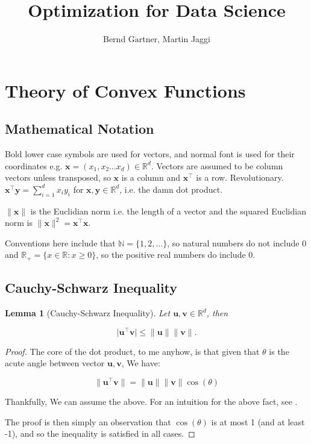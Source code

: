 \documentclass{article}
\newtheorem{lemma}[theorem]{Lemma}
\begin{document}
\title{Optimization for Data Science}
\author{Bernd G$\ddot{\text{a}}$rtner, Martin Jaggi}
\date{}

\maketitle

\section{Theory of Convex Functions}

	\subsection{Mathematical Notation}
	
		Bold lower case symbols are used for vectors, and normal font is used for their coordinates e.g. $\mathbf{x} = (x_1, x_2\ldots x_d)\in \mathbb{R}^d$. Vectors are assumed to be column vectors unless transposed, so $\mathbf{x}$ is a column and $\mathbf{x}^\top$ is a row. Revolutionary. $\mathbf{x^\top y} = \sum^d_{i=1} x_i y_i$ for $\mathbf{x, y}\in\mathbb{R}^d$, i.e. the damn dot product.
		
		$\|\mathbf{x}\|$ is the Euclidian norm i.e. the length of a vector and the squared Euclidian norm is $\|\mathbf{x}\|^2 = \mathbf{x^\top x}$.
		
		Conventions here include that $\mathbb{N} = \{1, 2,\ldots \}$, so natural numbers do not include 0 and $\mathbb{R}_+ = \{x\in\mathbb{R}: x\ge 0 \}$, so the positive real numbers do include 0.
		
	\subsection{Cauchy-Schwarz Inequality}

		\begin{lemma}[Cauchy-Schwarz Inequality]
			Let $\mathbf{u, v}\in\mathbb{R}^d$, then
			
			\[ |\mathbf{u^\top v| \le \|u\|\|v\|}. \]
		\end{lemma}

		\begin{proof}
			The core of the dot product, to me anyhow, is that given that $\theta$ is the acute angle between vector $\mathbf{u, v}$, We have:
			
			\[ \|\mathbf{u^\top v \| = \|u\|\|v\|}\cos(\theta) \]
			
			Thankfully, We can assume the above. For an intuition for the above fact, see \href{https://www.youtube.com/watch?v=LyGKycYT2v0}{\color{blue}{here}}.
			
			The proof is then simply an observation that $\cos(\theta)$ is at most 1 (and at least -1), and so the inequality is satisfied in all cases.	
		\end{proof}
		
\end{document}
